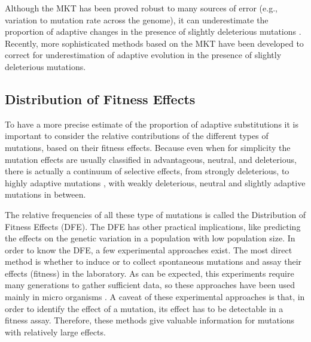 Although the MKT has been proved robust to many sources of error (e.g., variation to mutation rate across the genome), it can underestimate the proportion of adaptive changes in the presence of slightly deleterious mutations
	 \citep{Messer2013,Eyre-Walker2006a}.
Recently, more sophisticated methods based on the MKT have been developed to correct for underestimation of adaptive evolution in the presence of slightly deleterious mutations. 


\subsection{Distribution of Fitness Effects}

To have a more precise estimate of the proportion of adaptive substitutions it is important to consider the relative contributions of the different types of mutations, based on their fitness effects.
Because even when for simplicity the mutation effects are usually classified in advantageous, neutral, and deleterious, there is actually a continuum of selective effects, from strongly deleterious, 
to highly adaptive mutations	
	\citep{Eyre-Walker2007},
with weakly deleterious, neutral and slightly adaptive mutations in between.

The relative frequencies of all these type of mutations is called the Distribution of Fitness Effects (DFE).
The DFE has other practical implications, like predicting the effects on the genetic variation in a population with low population size.
In order to know the DFE, a few experimental approaches exist. The most direct method is whether to induce 
	\citep{Sanjuan2004}
or to collect
	\citep{MUKAI1964}
spontaneous mutations and assay their effects (fitness) in the laboratory.
As can be expected, this experiments require many generations to gather sufficient data, so these approaches have been used mainly in micro organisms
	\citep{Eyre-Walker2007}.
A caveat of these experimental approaches is that, in order to identify the effect of a mutation, its effect has to be detectable in a fitness assay.
Therefore, these methods give valuable information for mutations with relatively large effects.

